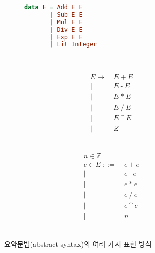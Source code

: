 \begin{figure}[H]\vspace*{-4ex}
\begin{subfigure}[b]{0.3\textwidth}
\begin{lstlisting}[language=Haskell,basicstyle=\linespread{1.1}\ttfamily]
data E = Add E E
       | Sub E E
       | Mul E E
       | Div E E
       | Exp E E
       | Lit Integer
\end{lstlisting}
~\vspace{-3.3ex}
\end{subfigure}
\hfill
\begin{subfigure}[b]{0.3\textwidth}\addtolength{\jot}{-.2em}
\begin{align*}
E  \to ~& E ~\texttt{+}~ E
\\ \mid~& E ~\texttt{-}~ E
\\ \mid~& E ~\texttt{*}~ E
\\ \mid~& E ~\texttt{/}~ E
\\ \mid~& E ~\texttt{\char`^}~ E
\\ \mid~& Z
\end{align*}
~\vspace{-4ex}
\end{subfigure}
\hfill
\begin{subfigure}[b]{0.3\textwidth}\addtolength{\jot}{-.2em}
\begin{align*}
n\in \mathbb{Z} \qquad\;& \\
e\in E ~
   ::= ~& e ~\texttt{+}~ e
\\ \mid~& e ~\texttt{-}~ e
\\ \mid~& e ~\texttt{*}~ e
\\ \mid~& e ~\texttt{/}~ e
\\ \mid~& e ~\texttt{\char`^}~ e
\\ \mid~& n_{\phantom{g}}
\end{align*}
~\vspace{-4ex}
\end{subfigure}
\caption{요약문법(abstract syntax)의 여러 가지 표현 방식
         \label{fig:AbsSyn}}
\end{figure}

